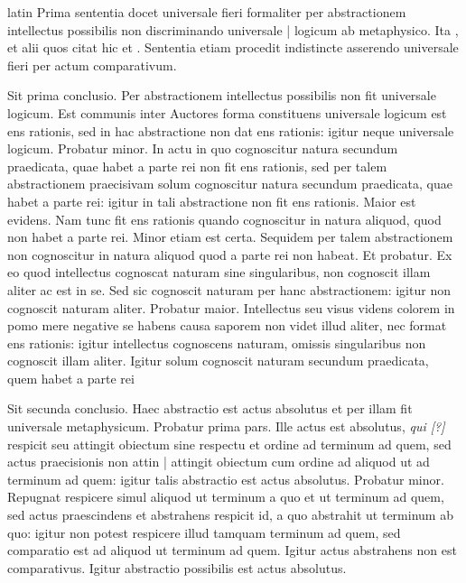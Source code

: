 \begin{otherlanguage*}{latin}
\pstart
Prima sententia docet universale fieri formaliter per abstractionem intellectus possibilis non discriminando universale \textnormal{|} logicum ab metaphysico. Ita ,  et alii quos citat  hic et . Sententia etiam procedit indistincte asserendo universale fieri per actum comparativum. 
\pend

\pstart
Sit prima conclusio. Per abstractionem intellectus possibilis non fit universale logicum. Est communis inter Auctores forma constituens universale logicum est ens rationis, sed in hac abstractione non dat ens rationis:
igitur neque universale logicum. Probatur minor. In actu in quo cognoscitur natura secundum praedicata, quae habet a parte rei non fit ens rationis, sed per talem abstractionem praecisivam solum cognoscitur natura secundum praedicata, quae habet a parte rei:
igitur in tali abstractione non fit ens rationis. Maior est evidens. Nam tunc fit ens rationis quando cognoscitur in natura aliquod, quod non habet a parte rei. Minor etiam est certa. Sequidem per talem abstractionem non cognoscitur in natura aliquod quod a parte rei non habeat. Et probatur. Ex eo quod intellectus cognoscat naturam sine singularibus, non cognoscit illam aliter ac est in se. Sed sic cognoscit naturam per hanc abstractionem:
igitur non cognoscit naturam aliter. Probatur maior. Intellectus seu visus videns colorem in pomo mere negative se habens causa saporem non videt illud aliter, nec format ens rationis:
igitur intellectus cognoscens naturam, omissis singularibus non cognoscit illam aliter. Igitur solum cognoscit naturam secundum praedicata, quem habet a parte rei 
\pend

\pstart
Sit secunda conclusio. Haec abstractio est actus absolutus et per illam fit universale metaphysicum. Probatur prima pars. Ille actus est absolutus, \emph{qui [?]} respicit seu attingit obiectum sine respectu et ordine ad terminum ad quem, sed actus praecisionis non attin \textnormal{|} attingit obiectum cum ordine ad aliquod ut ad terminum ad quem:
igitur talis abstractio est actus absolutus. Probatur minor. Repugnat respicere simul aliquod ut terminum a quo et ut terminum ad quem, sed actus praescindens et abstrahens respicit id, a quo abstrahit ut terminum ab quo:
igitur non potest respicere illud tamquam terminum ad quem, sed comparatio est ad aliquod ut terminum ad quem. Igitur actus abstrahens non est comparativus. Igitur abstractio possibilis est actus absolutus. 
\pend


\end{otherlanguage*}
